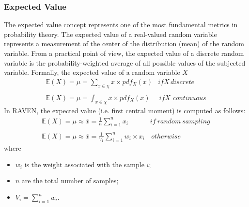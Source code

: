 \subsubsection{Expected Value}
The expected value concept represents one of the most fundamental metrics in probability theory. The expected value of a 
real-valued random variable represents a measurement of the center of the distribution (mean) of the random variable. 
From a practical point of view, the expected value of a discrete random variable is the probability-weighted average of all possible values of the subjected variable. Formally, the expected value of a random variable $X$
\begin{equation}
\begin{matrix}
\mathbb{E}(X) = \mu = \sum_{x \in \chi} x \times pdf_{X}(x) & if X \, discrete \\ 
\\ 
\mathbb{E}(X) = \mu = \int_{x \in \chi} x \times pdf_{X}(x) & \, if X \, \, continuous
\end{matrix}
\end{equation}
In RAVEN, the expected value (i.e. first central moment) is computed as follows:
\begin{equation}
\begin{matrix}
\mathbb{E}(X) = \mu \approx \overline{x} = \frac{1}{n} \sum_{i=1}^{n}  x_{i} & if \: random \: sampling \\ 
\\ 
\mathbb{E}(X) = \mu \approx \overline{x} = \frac{1}{V_{1}} \sum_{i=1}^{n} w_{i} \times x_{i}  & \, otherwise
\end{matrix}
\end{equation}
where 
\begin{itemize}
  \item $w_{i}$ is the weight associated with the sample $i$;
  \item $n$ are the total number of samples;
  \item $V_{i} = \sum_{i=1}^{n} w_{i}$.
\end{itemize}
